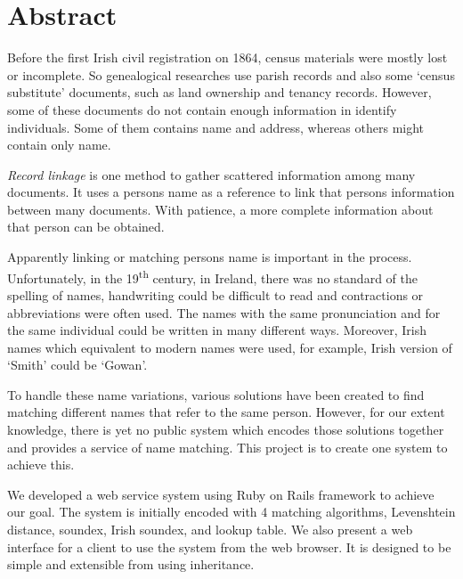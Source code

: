 

\begingroup
\let\clearpage\relax
\let\cleardoublepage\relax
\let\cleardoublepage\relax

\chapter*{Abstract}

Before the first Irish civil registration on 1864, census materials
were mostly lost or incomplete. So genealogical researches use
parish records and also some `census substitute' documents,
such as land ownership and tenancy records. However, some of these documents
do not contain enough information in identify individuals.
Some of them contains name and address, whereas others might contain only name.

\emph{Record linkage} is one method to gather scattered information among many documents.
It uses a person\textquotesingle s name as a reference to link that
person\textquotesingle s information between many documents. With patience,
a more complete information about that person can be obtained.

Apparently linking or matching person\textquotesingle s name is important in the process.
Unfortunately, in the 19\textsuperscript{th} century, in Ireland, there was no standard
of the spelling of names, handwriting could be difficult to read
and contractions or abbreviations were often used. The names with the same
pronunciation and for the same individual could be written in many different ways.
Moreover, Irish names which equivalent to modern names
were used, for example, Irish version of `Smith' could be `Gowan'.

To handle these name variations, various solutions have been created to find
matching different names that refer to the same person. However,
for our extent knowledge, there is yet no public system which encodes
those solutions together and provides a service of name matching.
This project is to create one system to achieve this.

We developed a web service system using Ruby on Rails framework
to achieve our goal. The system is initially encoded with 4 matching algorithms,
Levenshtein distance, soundex, Irish soundex, and lookup table.
We also present a web interface for a client to use the system
from the web browser. It is designed to be simple and extensible from using
inheritance.

\endgroup
\vfill
